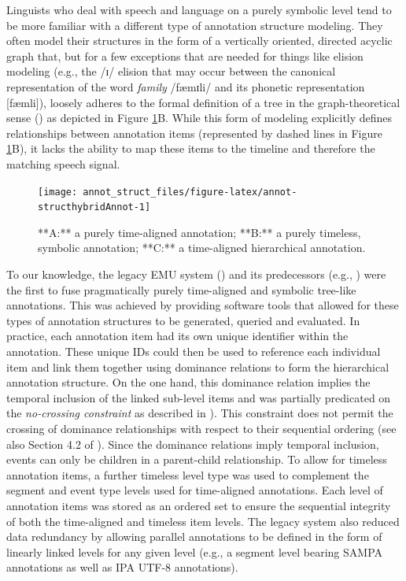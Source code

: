 \documentclass[]{book}
\theoremstyle{definition}
\theoremstyle{definition}
\theoremstyle{definition}
\theoremstyle{remark}
\begin{document}
Linguists who deal with speech and language on a purely symbolic level
tend to be more familiar with a different type of annotation structure
modeling. They often model their structures in the form of a vertically
oriented, directed acyclic graph that, but for a few exceptions that are
needed for things like elision modeling (e.g., the /ɪ/ elision that may
occur between the canonical representation of the word \emph{family}
/fæmɪli/ and its phonetic representation {[}fæmli{]}), loosely adheres
to the formal definition of a tree in the graph-theoretical sense
(\citet{knuth:ar1968a}) as depicted in Figure
\ref{fig:annot-structhybridAnnot}B. While this form of modeling
explicitly defines relationships between annotation items (represented
by dashed lines in Figure \ref{fig:annot-structhybridAnnot}B), it lacks
the ability to map these items to the timeline and therefore the
matching speech signal.

\begin{figure}

{\centering \texttt{[image: annot\_struct\_files/figure-latex/annot-structhybridAnnot-1]} 

}

\caption{**A:** a purely time-aligned annotation; **B:** a purely timeless, symbolic annotation; **C:** a time-aligned hierarchical annotation.}\label{fig:annot-structhybridAnnot}
\end{figure}

To our knowledge, the legacy EMU system (\citet{cassidy:sc2001a}) and
its predecessors (e.g., \citet{harrington:csl1993a}) were the first to
fuse pragmatically purely time-aligned and symbolic tree-like
annotations. This was achieved by providing software tools that allowed
for these types of annotation structures to be generated, queried and
evaluated. In practice, each annotation item had its own unique
identifier within the annotation. These unique IDs could then be used to
reference each individual item and link them together using dominance
relations to form the hierarchical annotation structure. On the one
hand, this dominance relation implies the temporal inclusion of the
linked sub-level items and was partially predicated on the
\emph{no-crossing constraint} as described in \citet{coleman:lp1991a}).
This constraint does not permit the crossing of dominance relationships
with respect to their sequential ordering (see also Section 4.2 of
\citet{cassidy:sc2001a}). Since the dominance relations imply temporal
inclusion, events can only be children in a parent-child relationship.
To allow for timeless annotation items, a further timeless level type
was used to complement the segment and event type levels used for
time-aligned annotations. Each level of annotation items was stored as
an ordered set to ensure the sequential integrity of both the
time-aligned and timeless item levels. The legacy system also reduced
data redundancy by allowing parallel annotations to be defined in the
form of linearly linked levels for any given level (e.g., a segment
level bearing SAMPA annotations as well as IPA UTF-8 annotations).
\end{document}
